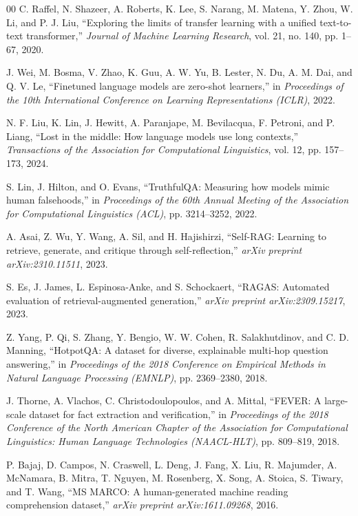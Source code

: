 \documentclass[conference]{IEEEtran}
\begin{document}
\begin{thebibliography}{00}
C. Raffel, N. Shazeer, A. Roberts, K. Lee, S. Narang, M. Matena, Y. Zhou, W. Li, and P. J. Liu, ``Exploring the limits of transfer learning with a unified text-to-text transformer,'' \textit{Journal of Machine Learning Research}, vol. 21, no. 140, pp. 1--67, 2020.

J. Wei, M. Bosma, V. Zhao, K. Guu, A. W. Yu, B. Lester, N. Du, A. M. Dai, and Q. V. Le, ``Finetuned language models are zero-shot learners,'' in \textit{Proceedings of the 10th International Conference on Learning Representations (ICLR)}, 2022.

N. F. Liu, K. Lin, J. Hewitt, A. Paranjape, M. Bevilacqua, F. Petroni, and P. Liang, ``Lost in the middle: How language models use long contexts,'' \textit{Transactions of the Association for Computational Linguistics}, vol. 12, pp. 157--173, 2024.

S. Lin, J. Hilton, and O. Evans, ``TruthfulQA: Measuring how models mimic human falsehoods,'' in \textit{Proceedings of the 60th Annual Meeting of the Association for Computational Linguistics (ACL)}, pp. 3214--3252, 2022.

A. Asai, Z. Wu, Y. Wang, A. Sil, and H. Hajishirzi, ``Self-RAG: Learning to retrieve, generate, and critique through self-reflection,'' \textit{arXiv preprint arXiv:2310.11511}, 2023.

S. Es, J. James, L. Espinosa-Anke, and S. Schockaert, ``RAGAS: Automated evaluation of retrieval-augmented generation,'' \textit{arXiv preprint arXiv:2309.15217}, 2023.

Z. Yang, P. Qi, S. Zhang, Y. Bengio, W. W. Cohen, R. Salakhutdinov, and C. D. Manning, ``HotpotQA: A dataset for diverse, explainable multi-hop question answering,'' in \textit{Proceedings of the 2018 Conference on Empirical Methods in Natural Language Processing (EMNLP)}, pp. 2369--2380, 2018.

J. Thorne, A. Vlachos, C. Christodoulopoulos, and A. Mittal, ``FEVER: A large-scale dataset for fact extraction and verification,'' in \textit{Proceedings of the 2018 Conference of the North American Chapter of the Association for Computational Linguistics: Human Language Technologies (NAACL-HLT)}, pp. 809--819, 2018.

P. Bajaj, D. Campos, N. Craswell, L. Deng, J. Fang, X. Liu, R. Majumder, A. McNamara, B. Mitra, T. Nguyen, M. Rosenberg, X. Song, A. Stoica, S. Tiwary, and T. Wang, ``MS MARCO: A human-generated machine reading comprehension dataset,'' \textit{arXiv preprint arXiv:1611.09268}, 2016.


\end{thebibliography}
\end{document}
